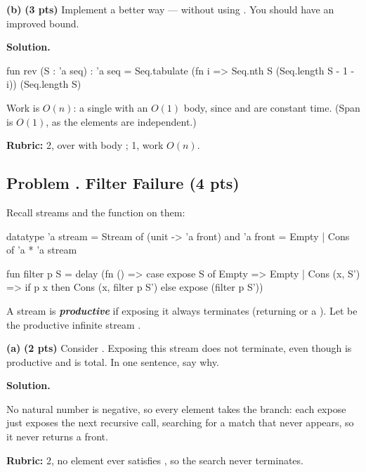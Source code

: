 \documentclass[crop=false]{standalone}
\newif\ifsol
\newenvironment{solution}
    {\par\color{solution_color}\begin{framed}\textbf{Solution.}\par}
    {\end{framed}}
\newcommand{\term}[1]{\textbf{\textit{#1}}}
\newcommand{\quizproblem}[3]{%
  \needspace{5\baselineskip}%
  \stepcounter{problem}%
  \ifsol
    \subsection*{Problem \arabic{problem}. #1 \hfill \timing{#2} \quad (#3 pts)}%
  \else
    \subsection*{Problem \arabic{problem}. #1 \hfill (#3 pts)}%
  \fi
}
\newcommand{\subpts}[1]{\textbf{(#1 pts)}}
\newcommand{\answerspace}[1]{\ifsol\else\vspace{#1}\par\fi}
\begin{document}
\textbf{(b)} \subpts{3} Implement  a better way --- without
using . You should have an improved bound.

\answerspace{4cm}

\begin{solution}
\begin{codeblock}
  fun rev (S : 'a seq) : 'a seq =
    Seq.tabulate (fn i => Seq.nth S (Seq.length S - 1 - i))
                 (Seq.length S)
\end{codeblock}
Work is $O(n)$: a single  with an $O(1)$ body, since
 and  are constant time. (Span is $O(1)$, as the
elements are independent.)

\textbf{Rubric:} 2,  over  with body
; 1, work $O(n)$.
\end{solution}

\newpage


\quizproblem{Filter Failure}{6}{4}

Recall streams and the  function on them:

\begin{codeblock}
  datatype 'a stream = Stream of (unit -> 'a front)
       and 'a front  = Empty | Cons of 'a * 'a stream

  fun filter p S =
    delay (fn () =>
      case expose S of
        Empty        => Empty
      | Cons (x, S') => if p x then Cons (x, filter p S')
                        else expose (filter p S'))
\end{codeblock}

A stream is \term{productive} if exposing it always terminates (returning
 or a ). Let  be the productive infinite
stream .

\textbf{(a)} \subpts{2} Consider .
Exposing this stream does not terminate, even though  is
productive and  is total. In one sentence, say why.

\answerspace{3cm}

\begin{solution}
No natural number is negative, so every element takes the 
branch: each expose just exposes the next recursive  call,
searching for a match that never appears, so it never returns a front.

\textbf{Rubric:} 2, no element ever satisfies , so the search
never terminates.
\end{solution}
\end{document}
